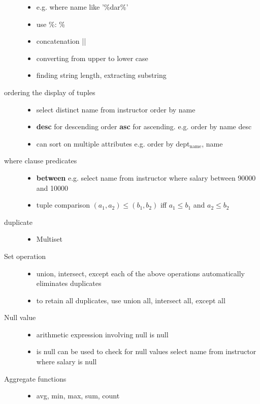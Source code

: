 \documentclass[11pt]{article}
\begin{document}
\begin{description}
\begin{itemize}
\item e.g. where name like '\%dar\%'
\item use \%: \%
\item concatenation ||
\item converting from upper to lower case
\item finding string length, extracting substring
\end{itemize}
\item[{ordering the display of tuples}] \begin{itemize}
\item select distinct name from instructor order by name
\item \textbf{desc} for descending order \textbf{asc} for ascending.
e.g. order by name desc
\item can sort on multiple attributes
e.g. order by dept$_{\text{name}}$, name
\end{itemize}
\item[{where clause predicates}] \begin{itemize}
\item \textbf{between}
       e.g. select name from instructor where salary between 90000 and 10000
\item tuple comparison
$(a_1,a_2)\le(b_1,b_2)$ iff $a_1\le b_1$ and $a_2\le b_2$
\end{itemize}
\item[{duplicate}] \begin{itemize}
\item Multiset
\end{itemize}
\item[{Set operation}] \begin{itemize}
\item union, intersect, except
each of the above operations automatically eliminates duplicates
\item to retain all duplicates, use union all, intersect all, except all
\end{itemize}
\item[{Null value}] \begin{itemize}
\item arithmetic expression involving null is null
\item is null can be used to check for null values
select name from instructor where salary is null
\end{itemize}
\item[{Aggregate functions}] \begin{itemize}
\item avg, min, max, sum, count

\end{itemize}
\end{description}
\end{document}
